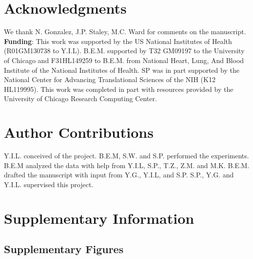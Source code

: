 \section{Acknowledgments}\label{ch02-acknowledgments}

We thank N. Gonzalez, J.P. Staley, M.C. Ward for comments on the manuscript. \textbf{Funding}: This work was supported by the US National Institutes of Health (R01GM130738 to  Y.I.L). B.E.M. supported by T32 GM09197 to the University of Chicago and F31HL149259 to B.E.M. from National Heart, Lung, And Blood Institute of the National Institutes of Health. SP was in part supported by the National Center for Advancing Translational Sciences of the NIH (K12 HL119995). This work was completed in part with resources provided by the University of Chicago Research Computing Center.

\section{Author Contributions}\label{ch02-author-contributions}

 Y.I.L. conceived of the project. B.E.M, S.W. and S.P. performed the experiments. B.E.M analyzed the data with help from Y.I.L, S.P., T.Z., Z.M. and M.K. B.E.M. drafted the manuscript with input from Y.G., Y.I.L, and S.P. S.P., Y.G. and Y.I.L. supervised this project. 

\clearpage
\section{Supplementary Information}\label{ch02-supplementary-information}

\subsection{Supplementary Figures}\label{ch02-supplementary-figures}
\clearpage

